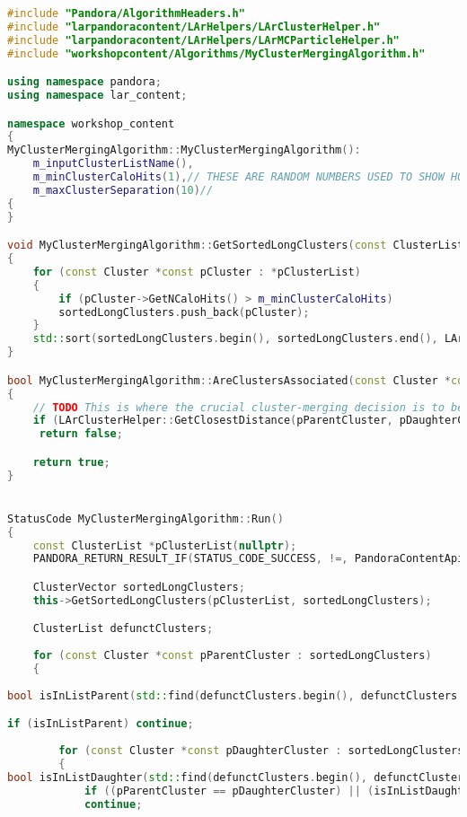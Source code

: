 \begin{lstlisting}[language=C++,caption=MyClusterMergingAlgorithm.cc]
#include "Pandora/AlgorithmHeaders.h"
#include "larpandoracontent/LArHelpers/LArClusterHelper.h"
#include "larpandoracontent/LArHelpers/LArMCParticleHelper.h"
#include "workshopcontent/Algorithms/MyClusterMergingAlgorithm.h"

using namespace pandora;
using namespace lar_content;

namespace workshop_content
{
MyClusterMergingAlgorithm::MyClusterMergingAlgorithm():
	m_inputClusterListName(),
	m_minClusterCaloHits(1),// THESE ARE RANDOM NUMBERS USED TO SHOW HOW IT WORKS
	m_maxClusterSeparation(10)//
{
}

void MyClusterMergingAlgorithm::GetSortedLongClusters(const ClusterList *const pClusterList, ClusterVector &sortedLongClusters) const
{
	for (const Cluster *const pCluster : *pClusterList)
	{
		if (pCluster->GetNCaloHits() > m_minClusterCaloHits)
		sortedLongClusters.push_back(pCluster);
	}
	std::sort(sortedLongClusters.begin(), sortedLongClusters.end(), LArClusterHelper::SortByNHits);
}

bool MyClusterMergingAlgorithm::AreClustersAssociated(const Cluster *const pParentCluster, const Cluster *const pDaughterCluster) const
{
	// TODO This is where the crucial cluster-merging decision is to be made - add sophistication here!
	if (LArClusterHelper::GetClosestDistance(pParentCluster, pDaughterCluster) > m_maxClusterSeparation)
	 return false;

	return true;
}


StatusCode MyClusterMergingAlgorithm::Run()
{
	const ClusterList *pClusterList(nullptr);
	PANDORA_RETURN_RESULT_IF(STATUS_CODE_SUCCESS, !=, PandoraContentApi::GetList(*this, m_inputClusterListName, pClusterList));

	ClusterVector sortedLongClusters;
	this->GetSortedLongClusters(pClusterList, sortedLongClusters);

	ClusterList defunctClusters;
	
	for (const Cluster *const pParentCluster : sortedLongClusters)
	{
 
bool isInListParent(std::find(defunctClusters.begin(), defunctClusters.end(), pParentCluster) != defunctClusters.end());

if (isInListParent) continue;
		
		for (const Cluster *const pDaughterCluster : sortedLongClusters)
		{
bool isInListDaughter(std::find(defunctClusters.begin(), defunctClusters.end(), pDaughterCluster) != defunctClusters.end());
			if ((pParentCluster == pDaughterCluster) || (isInListDaughter))
			continue;
			

\end{lstlisting}
